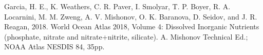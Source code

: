 \documentclass[essd, manuscript]{copernicus}
\begin{document}
Garcia, H. E., K. Weathers, C. R. Paver, I. Smolyar, T. P. Boyer, R. A. Locarnini, M. M. Zweng, A. V. Mishonov, O. K. Baranova, D. Seidov, and J. R. Reagan, 2018. World Ocean Atlas 2018, Volume 4: Dissolved Inorganic Nutrients (phosphate, nitrate and nitrate+nitrite, silicate). A. Mishonov Technical Ed.; NOAA Atlas NESDIS 84, 35pp.





%
%
%
%
%
%
%
%
%
%
%
%
%
%
%
%
%
%
%
%
%
\end{document}
